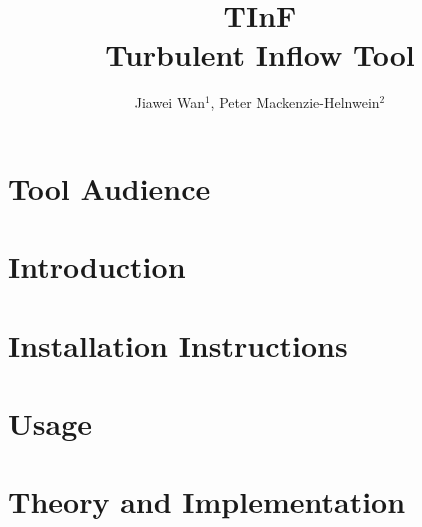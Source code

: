\documentclass{simcenterdocumentation}
\begin{document}
\title{TInF\\ \Large Turbulent Inflow Tool}
\author{Jiawei Wan$^{1}$, Peter Mackenzie-Helnwein$^2$}

\hypersetup{pageanchor=false}
\maketitle
\copyrightpage
\acknowledgments

\hypersetup{pageanchor=true}
\begin{frontmatter}

\pagestyle{plain}
{
  \renewcommand{\thispagestyle}[1]{}
  \tableofcontents
  \clearpage
  \listoffigures
}

\end{frontmatter}
\pagestyle{somewhatsimple}

\chapter{Tool Audience}


\chapter{Introduction}


\chapter{Installation Instructions}


\chapter{Usage}


\chapter{Theory and Implementation}
\end{document}
